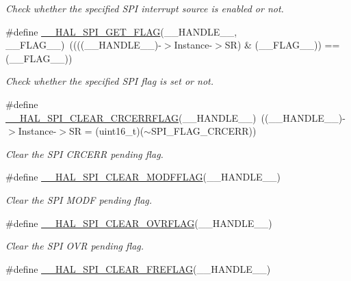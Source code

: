 \begin{DoxyCompactItemize}
\begin{DoxyCompactList}\small\item\em Check whether the specified S\+PI interrupt source is enabled or not. \end{DoxyCompactList}\item 
\#define \hyperlink{group___s_p_i___exported___macros_gaa0bbe5fb55f93fd277ddb6acf58cec53}{\+\_\+\+\_\+\+H\+A\+L\+\_\+\+S\+P\+I\+\_\+\+G\+E\+T\+\_\+\+F\+L\+AG}(\+\_\+\+\_\+\+H\+A\+N\+D\+L\+E\+\_\+\+\_\+,  \+\_\+\+\_\+\+F\+L\+A\+G\+\_\+\+\_\+)~((((\+\_\+\+\_\+\+H\+A\+N\+D\+L\+E\+\_\+\+\_\+)-\/$>$Instance-\/$>$SR) \& (\+\_\+\+\_\+\+F\+L\+A\+G\+\_\+\+\_\+)) == (\+\_\+\+\_\+\+F\+L\+A\+G\+\_\+\+\_\+))
\begin{DoxyCompactList}\small\item\em Check whether the specified S\+PI flag is set or not. \end{DoxyCompactList}\item 
\#define \hyperlink{group___s_p_i___exported___macros_gad1cb4100b67726531ad426d300f4cd26}{\+\_\+\+\_\+\+H\+A\+L\+\_\+\+S\+P\+I\+\_\+\+C\+L\+E\+A\+R\+\_\+\+C\+R\+C\+E\+R\+R\+F\+L\+AG}(\+\_\+\+\_\+\+H\+A\+N\+D\+L\+E\+\_\+\+\_\+)~((\+\_\+\+\_\+\+H\+A\+N\+D\+L\+E\+\_\+\+\_\+)-\/$>$Instance-\/$>$SR = (uint16\+\_\+t)($\sim$S\+P\+I\+\_\+\+F\+L\+A\+G\+\_\+\+C\+R\+C\+E\+RR))
\begin{DoxyCompactList}\small\item\em Clear the S\+PI C\+R\+C\+E\+RR pending flag. \end{DoxyCompactList}\item 
\#define \hyperlink{group___s_p_i___exported___macros_ga6c88becbe528c542156bc201622efba2}{\+\_\+\+\_\+\+H\+A\+L\+\_\+\+S\+P\+I\+\_\+\+C\+L\+E\+A\+R\+\_\+\+M\+O\+D\+F\+F\+L\+AG}(\+\_\+\+\_\+\+H\+A\+N\+D\+L\+E\+\_\+\+\_\+)
\begin{DoxyCompactList}\small\item\em Clear the S\+PI M\+O\+DF pending flag. \end{DoxyCompactList}\item 
\#define \hyperlink{group___s_p_i___exported___macros_gaf6af33b1c5d334b9fe7bb778c5b6442e}{\+\_\+\+\_\+\+H\+A\+L\+\_\+\+S\+P\+I\+\_\+\+C\+L\+E\+A\+R\+\_\+\+O\+V\+R\+F\+L\+AG}(\+\_\+\+\_\+\+H\+A\+N\+D\+L\+E\+\_\+\+\_\+)
\begin{DoxyCompactList}\small\item\em Clear the S\+PI O\+VR pending flag. \end{DoxyCompactList}\item 
\#define \hyperlink{group___s_p_i___exported___macros_ga7ff182f5cf6c731318c882351d6d7ac2}{\+\_\+\+\_\+\+H\+A\+L\+\_\+\+S\+P\+I\+\_\+\+C\+L\+E\+A\+R\+\_\+\+F\+R\+E\+F\+L\+AG}(\+\_\+\+\_\+\+H\+A\+N\+D\+L\+E\+\_\+\+\_\+)

\end{DoxyCompactItemize}

